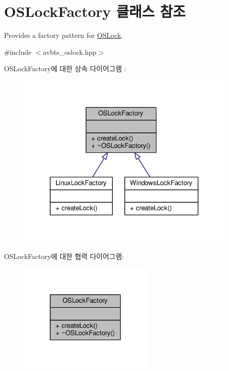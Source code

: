 \hypertarget{class_o_s_lock_factory}{}\section{O\+S\+Lock\+Factory 클래스 참조}
\label{class_o_s_lock_factory}


Provides a factory pattern for \hyperlink{class_o_s_lock}{O\+S\+Lock}.  




{\ttfamily \#include $<$avbts\+\_\+oslock.\+hpp$>$}



O\+S\+Lock\+Factory에 대한 상속 다이어그램 \+: 
\nopagebreak
\begin{figure}[H]
\begin{center}
\leavevmode
\includegraphics[width=304pt]{class_o_s_lock_factory__inherit__graph}
\end{center}
\end{figure}


O\+S\+Lock\+Factory에 대한 협력 다이어그램\+:
\nopagebreak
\begin{figure}[H]
\begin{center}
\leavevmode
\includegraphics[width=186pt]{class_o_s_lock_factory__coll__graph}
\end{center}
\end{figure}
